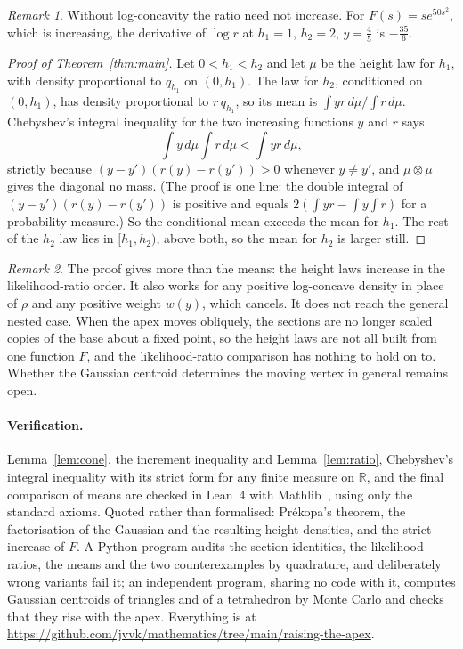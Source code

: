 \documentclass[11pt]{article}
\theoremstyle{remark}
\newtheorem*{remark}{Remark}
\begin{document}
\begin{remark}
Without log-concavity the ratio need not increase. For $F(s)=se^{50s^2}$, which is increasing, the derivative
of $\log r$ at $h_1=1$, $h_2=2$, $y=\frac45$ is $-\frac{35}6$.
\end{remark}

\begin{proof}[Proof of Theorem~\ref{thm:main}]
Let $0<h_1<h_2$ and let $\mu$ be the height law for $h_1$, with density proportional to $q_{h_1}$ on $(0,h_1)$.
The law for $h_2$, conditioned on $(0,h_1)$, has density proportional to $r\,q_{h_1}$, so its mean is
$\int yr\,d\mu\big/\!\int r\,d\mu$. Chebyshev's integral inequality for the two increasing functions $y$ and $r$
says
\[
\int y\,d\mu\int r\,d\mu<\int yr\,d\mu ,
\]
strictly because $(y-y')(r(y)-r(y'))>0$ whenever $y\ne y'$, and $\mu\otimes\mu$ gives the diagonal no mass. (The
proof is one line: the double integral of $(y-y')(r(y)-r(y'))$ is positive and equals
$2(\int yr-\int y\int r)$ for a probability measure.) So the conditional mean exceeds the mean for $h_1$. The
rest of the $h_2$ law lies in $[h_1,h_2)$, above both, so the mean for $h_2$ is larger still.
\end{proof}

\begin{remark}
The proof gives more than the means: the height laws increase in the likelihood-ratio order. It also works for
any positive log-concave density in place of $\rho$ and any positive weight $w(y)$, which cancels. It does not
reach the general nested case. When the apex moves obliquely, the sections are no longer scaled copies of the
base about a fixed point, so the height laws are not all built from one function $F$, and the likelihood-ratio
comparison has nothing to hold on to. Whether the Gaussian centroid determines the moving vertex in general
remains open.
\end{remark}

\paragraph{Verification.} Lemma~\ref{lem:cone}, the increment inequality and Lemma~\ref{lem:ratio},
Chebyshev's integral inequality with its strict form for any finite measure on $\mathbb R$, and the final
comparison of means are checked in Lean~4 with Mathlib~\cite{mathlib}, using only the standard axioms. Quoted
rather than formalised: Pr\'ekopa's theorem, the factorisation of the Gaussian and the resulting height
densities, and the strict increase of $F$. A Python program audits the section identities, the likelihood
ratios, the means and the two counterexamples by quadrature, and deliberately wrong variants fail it; an
independent program, sharing no code with it, computes Gaussian centroids of triangles and of a tetrahedron by
Monte Carlo and checks that they rise with the apex. Everything is at
\url{https://github.com/jvvk/mathematics/tree/main/raising-the-apex}.
\end{document}
